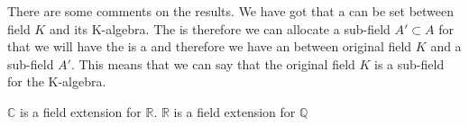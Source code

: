 There are some comments on the results. We have got that a
 can be set between field $K$ and its
K-algebra.
The  is 
therefore we can allocate a sub-field $A' \subset A$ for that we will
have the  is a  and
therefore we have an  between original field $K$
and a sub-field $A'$. This means that we can say that the original
field $K$ is a sub-field for the K-algebra.

\begin{example}
  $\mathbb{C}$ is a field extension for $\mathbb{R}$.
  $\mathbb{R}$ is a field extension for $\mathbb{Q}$
  \label{ex:fieldextension}
\end{example}

